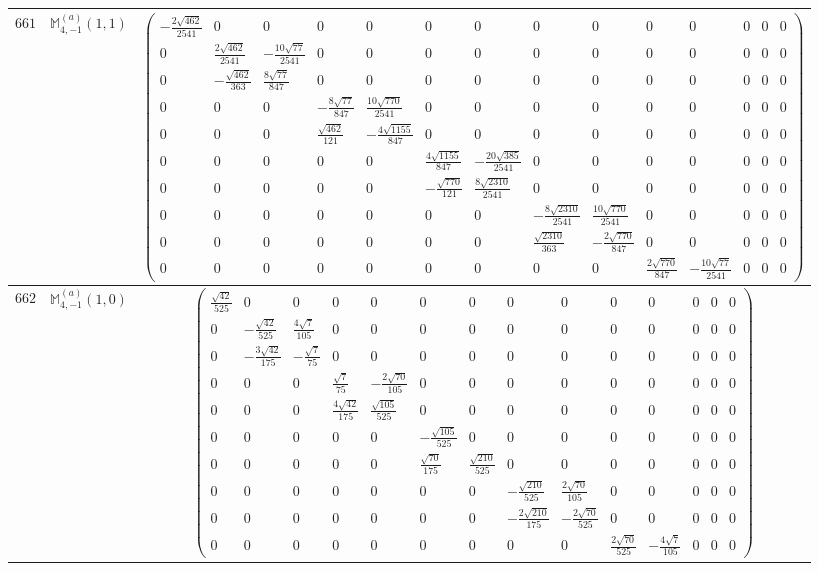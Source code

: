 \documentclass[fleqn,8pt,landscape]{jsarticle}
\begin{document}
\begin{center}
\begin{longtable}{ccc}
$ 661 $ & $ \mathbb{M}_{4,-1}^{(a)}(1,1) $ & $ \begin{pmatrix} - \frac{2 \sqrt{462}}{2541} & 0 & 0 & 0 & 0 & 0 & 0 & 0 & 0 & 0 & 0 & 0 & 0 & 0 \\ 0 & \frac{2 \sqrt{462}}{2541} & - \frac{10 \sqrt{77}}{2541} & 0 & 0 & 0 & 0 & 0 & 0 & 0 & 0 & 0 & 0 & 0 \\ 0 & - \frac{\sqrt{462}}{363} & \frac{8 \sqrt{77}}{847} & 0 & 0 & 0 & 0 & 0 & 0 & 0 & 0 & 0 & 0 & 0 \\ 0 & 0 & 0 & - \frac{8 \sqrt{77}}{847} & \frac{10 \sqrt{770}}{2541} & 0 & 0 & 0 & 0 & 0 & 0 & 0 & 0 & 0 \\ 0 & 0 & 0 & \frac{\sqrt{462}}{121} & - \frac{4 \sqrt{1155}}{847} & 0 & 0 & 0 & 0 & 0 & 0 & 0 & 0 & 0 \\ 0 & 0 & 0 & 0 & 0 & \frac{4 \sqrt{1155}}{847} & - \frac{20 \sqrt{385}}{2541} & 0 & 0 & 0 & 0 & 0 & 0 & 0 \\ 0 & 0 & 0 & 0 & 0 & - \frac{\sqrt{770}}{121} & \frac{8 \sqrt{2310}}{2541} & 0 & 0 & 0 & 0 & 0 & 0 & 0 \\ 0 & 0 & 0 & 0 & 0 & 0 & 0 & - \frac{8 \sqrt{2310}}{2541} & \frac{10 \sqrt{770}}{2541} & 0 & 0 & 0 & 0 & 0 \\ 0 & 0 & 0 & 0 & 0 & 0 & 0 & \frac{\sqrt{2310}}{363} & - \frac{2 \sqrt{770}}{847} & 0 & 0 & 0 & 0 & 0 \\ 0 & 0 & 0 & 0 & 0 & 0 & 0 & 0 & 0 & \frac{2 \sqrt{770}}{847} & - \frac{10 \sqrt{77}}{2541} & 0 & 0 & 0 \end{pmatrix} $ \\ \hline
$ 662 $ & $ \mathbb{M}_{4,-1}^{(a)}(1,0) $ & $ \begin{pmatrix} \frac{\sqrt{42}}{525} & 0 & 0 & 0 & 0 & 0 & 0 & 0 & 0 & 0 & 0 & 0 & 0 & 0 \\ 0 & - \frac{\sqrt{42}}{525} & \frac{4 \sqrt{7}}{105} & 0 & 0 & 0 & 0 & 0 & 0 & 0 & 0 & 0 & 0 & 0 \\ 0 & - \frac{3 \sqrt{42}}{175} & - \frac{\sqrt{7}}{75} & 0 & 0 & 0 & 0 & 0 & 0 & 0 & 0 & 0 & 0 & 0 \\ 0 & 0 & 0 & \frac{\sqrt{7}}{75} & - \frac{2 \sqrt{70}}{105} & 0 & 0 & 0 & 0 & 0 & 0 & 0 & 0 & 0 \\ 0 & 0 & 0 & \frac{4 \sqrt{42}}{175} & \frac{\sqrt{105}}{525} & 0 & 0 & 0 & 0 & 0 & 0 & 0 & 0 & 0 \\ 0 & 0 & 0 & 0 & 0 & - \frac{\sqrt{105}}{525} & 0 & 0 & 0 & 0 & 0 & 0 & 0 & 0 \\ 0 & 0 & 0 & 0 & 0 & \frac{\sqrt{70}}{175} & \frac{\sqrt{210}}{525} & 0 & 0 & 0 & 0 & 0 & 0 & 0 \\ 0 & 0 & 0 & 0 & 0 & 0 & 0 & - \frac{\sqrt{210}}{525} & \frac{2 \sqrt{70}}{105} & 0 & 0 & 0 & 0 & 0 \\ 0 & 0 & 0 & 0 & 0 & 0 & 0 & - \frac{2 \sqrt{210}}{175} & - \frac{2 \sqrt{70}}{525} & 0 & 0 & 0 & 0 & 0 \\ 0 & 0 & 0 & 0 & 0 & 0 & 0 & 0 & 0 & \frac{2 \sqrt{70}}{525} & - \frac{4 \sqrt{7}}{105} & 0 & 0 & 0 \end{pmatrix} $ \\ \hline

\end{longtable}
\end{center}
\end{document}
